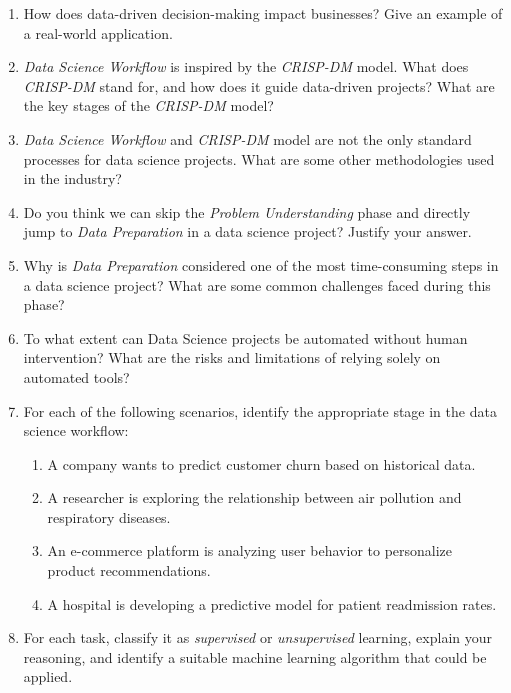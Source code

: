 \documentclass[
  11pt,
]{book}
\providecommand{\tightlist}{%
  \setlength{\itemsep}{0pt}\setlength{\parskip}{0pt}}
\theoremstyle{definition}
\theoremstyle{definition}
\theoremstyle{definition}
\theoremstyle{definition}
\theoremstyle{remark}
\begin{document}
\begin{enumerate}
\def\labelenumi{\arabic{enumi}.}
\tightlist
\item
  How does data-driven decision-making impact businesses? Give an example of a real-world application.\\
\item
  \emph{Data Science Workflow} is inspired by the \emph{CRISP-DM} model. What does \emph{CRISP-DM} stand for, and how does it guide data-driven projects? What are the key stages of the \emph{CRISP-DM} model?\\
\item
  \emph{Data Science Workflow} and \emph{CRISP-DM} model are not the only standard processes for data science projects. What are some other methodologies used in the industry?\\
\item
  Do you think we can skip the \emph{Problem Understanding} phase and directly jump to \emph{Data Preparation} in a data science project? Justify your answer.\\
\item
  Why is \emph{Data Preparation} considered one of the most time-consuming steps in a data science project? What are some common challenges faced during this phase?\\
\item
  To what extent can Data Science projects be automated without human intervention? What are the risks and limitations of relying solely on automated tools?\\
\item
  For each of the following scenarios, identify the appropriate stage in the data science workflow:

  \begin{enumerate}
  \def\labelenumii{\alph{enumii}.}
  \tightlist
  \item
    A company wants to predict customer churn based on historical data.\\
  \item
    A researcher is exploring the relationship between air pollution and respiratory diseases.\\
  \item
    An e-commerce platform is analyzing user behavior to personalize product recommendations.\\
  \item
    A hospital is developing a predictive model for patient readmission rates.\\
  \end{enumerate}
\item
  For each task, classify it as \emph{supervised} or \emph{unsupervised} learning, explain your reasoning, and identify a suitable machine learning algorithm that could be applied.


\end{enumerate}
\end{document}
